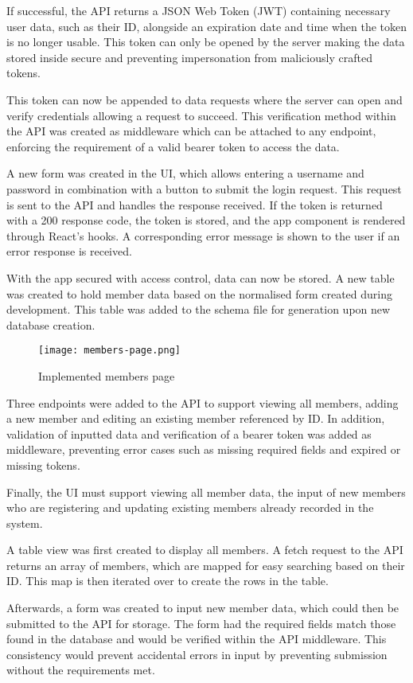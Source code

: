 If successful, the API returns a JSON Web Token (JWT) containing necessary user data, such as their ID, alongside an expiration date and time when the token is no longer usable. This token can only be opened by the server making the data stored inside secure and preventing impersonation from maliciously crafted tokens.

This token can now be appended to data requests where the server can open and verify credentials allowing a request to succeed. This verification method within the API was created as middleware which can be attached to any endpoint, enforcing the requirement of a valid bearer token to access the data.

A new form was created in the UI, which allows entering a username and password in combination with a button to submit the login request. This request is sent to the API and handles the response received. If the token is returned with a 200 response code, the token is stored, and the app component is rendered through React's hooks. A corresponding error message is shown to the user if an error response is received.

With the app secured with access control, data can now be stored. A new table was created to hold member data based on the normalised form created during development. This table was added to the schema file for generation upon new database creation.

\begin{figure}[ht!]
    \centerline{\texttt{[image: members-page.png]}}
    \caption{Implemented members page}
    \label{fig:members-page}
\end{figure}

Three endpoints were added to the API to support viewing all members, adding a new member and editing an existing member referenced by ID. In addition, validation of inputted data and verification of a bearer token was added as middleware, preventing error cases such as missing required fields and expired or missing tokens.

Finally, the UI must support viewing all member data, the input of new members who are registering and updating existing members already recorded in the system.

A table view was first created to display all members. A fetch request to the API returns an array of members, which are mapped for easy searching based on their ID. This map is then iterated over to create the rows in the table.

Afterwards, a form was created to input new member data, which could then be submitted to the API for storage. The form had the required fields match those found in the database and would be verified within the API middleware. This consistency would prevent accidental errors in input by preventing submission without the requirements met.

